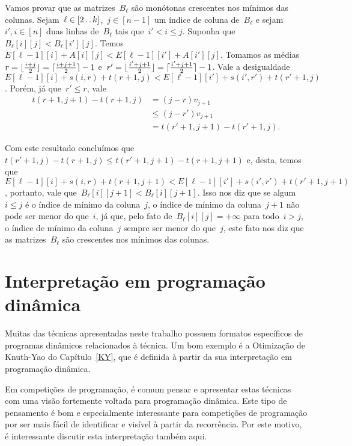 Vamos provar que as matrizes~$B_\ell$ são monótonas crescentes nos mínimos das colunas. Sejam~${ \ell \in [2 \,.\,.\, k] }$,~${ j \in [n-1] }$ um índice de coluna de~${ B_\ell }$ e sejam~${ i',i \in [n] }$ duas linhas de~$B_\ell$ tais que~${ i' < i \leq j }$. Suponha que~${ B_\ell[i][j] < B_\ell[i'][j] }$. Temos~${ E[\ell-1][i] + A[i][j] < E[\ell-1][i'] + A[i'][j] }$. Tomamos as médias~${ r = \lfloor\frac{i+j}{2}\rfloor = \lceil\frac{i+j+1}{2}\rceil - 1 }$ e~${ r' = \lfloor\frac{i'+j+1}{2}\rfloor = \lceil\frac{i'+j+1}{2}\rceil - 1 }$. Vale a desigualdade~${ E[\ell-1][i] + s(i,r) + t(r+1,j) < E[\ell-1][i'] + s(i',r') + t(r'+1,j) }$. Porém, já que~${ r' \leq r }$, vale
\begin{equation*}
\begin{array}{rl}
t(r+1,j+1) - t(r+1,j) & = (j-r)v_{j+1} \\
& \leq (j-r')v_{j+1} \\
& = t(r'+1,j+1) - t(r'+1,j) \text{.}
\end{array}
\end{equation*}
 
Com este resultado concluímos que~${ t(r'+1,j) - t(r+1,j) \leq t(r'+1,j+1) - t(r+1,j+1) }$ e, desta, temos que~${ E[\ell-1][i] + s(i,r) + t(r+1,j+1) < E[\ell-1][i'] + s(i',r') + t(r'+1,j+1) }$, portanto, vale que~${ B_\ell[i][j+1] < B_\ell[i][j+1] }$. Isso nos diz que se algum~${ i \leq j }$ é o índice de mínimo da coluna~$j$, o índice de mínimo da coluna~${j+1}$ não pode ser menor do que~$i$, já que, pelo fato de~${ B_\ell[i][j] = +\infty }$ para todo~${ i > j }$, o índice de mínimo da coluna~$j$ sempre ser menor do que~$j$, este fato nos diz que as matrizes~$B_\ell$ são crescentes nos mínimos das colunas.


\section{Interpretação em programação dinâmica} \label{DivConq:Inter_DP}

Muitas das técnicas apresentadas neste trabalho possuem formatos específicos de programas dinâmicos relacionados à técnica. Um bom exemplo é a Otimização de Knuth-Yao do Capítulo~\ref{KY}, que é definida à partir da sua interpretação em programação dinâmica. 

Em competições de programação, é comum pensar e apresentar estas técnicas com uma visão fortemente voltada para programação dinâmica. Este tipo de pensamento é bom e especialmente interessante para competições de programação por ser mais fácil de identificar e visível à partir da recorrência. Por este motivo, é interessante discutir esta interpretação também aqui.

